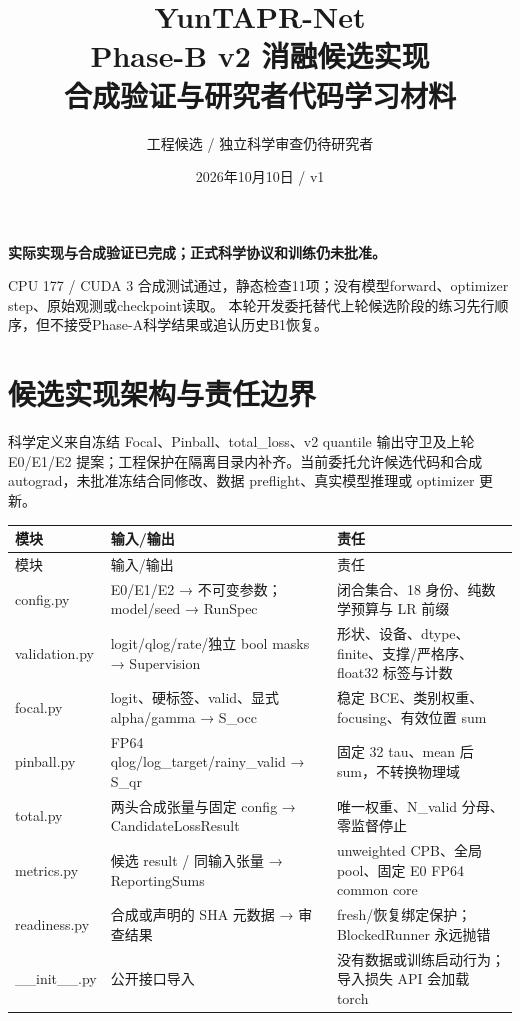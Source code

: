 \documentclass[UTF8,fontset=fandol,10pt]{ctexart}
\title{YunTAPR-Net\\Phase-B v2 消融候选实现\\合成验证与研究者代码学习材料}
\author{工程候选 / 独立科学审查仍待研究者}\date{2026年10月10日 / v1}
\begin{document}
\maketitle
\textbf{实际实现与合成验证已完成；正式科学协议和训练仍未批准。}

CPU 177 / CUDA 3 合成测试通过，静态检查11项；没有模型forward、optimizer step、原始观测或checkpoint读取。
本轮开发委托替代上轮候选阶段的练习先行顺序，但不接受Phase-A科学结果或追认历史B1恢复。
\setcounter{tocdepth}{1}\begingroup\small\setlength{\parskip}{0pt}\tableofcontents\endgroup
\clearpage\section{候选实现架构与责任边界}

科学定义来自冻结 Focal、Pinball、total\_\allowbreak{}loss、v2 quantile 输出守卫及上轮 E0/\allowbreak{}E1/\allowbreak{}E2 提案；工程保护在隔离目录内补齐。当前委托允许候选代码和合成 autograd，未批准冻结合同修改、数据 preflight、真实模型推理或 optimizer 更新。

\begingroup\small\setlength{\tabcolsep}{3pt}\renewcommand{\arraystretch}{1.12}
\begin{longtable}{>{\raggedright\arraybackslash}p{\dimexpr(\linewidth-6\tabcolsep)/3\relax}>{\raggedright\arraybackslash}p{\dimexpr(\linewidth-6\tabcolsep)/3\relax}>{\raggedright\arraybackslash}p{\dimexpr(\linewidth-6\tabcolsep)/3\relax}}
\toprule
模块 & 输入/\allowbreak{}输出 & 责任 \\
\midrule\endfirsthead
模块 & 输入/\allowbreak{}输出 & 责任 \\
\midrule\endhead
config.py & E0/\allowbreak{}E1/\allowbreak{}E2 → 不可变参数；model/\allowbreak{}seed → RunSpec & 闭合集合、18 身份、纯数学预算与 LR 前缀 \\
validation.py & logit/\allowbreak{}qlog/\allowbreak{}rate/\allowbreak{}独立 bool masks → Supervision & 形状、设备、dtype、finite、支撑/\allowbreak{}严格序、float32 标签与计数 \\
focal.py & logit、硬标签、valid、显式 alpha/\allowbreak{}gamma → S\_\allowbreak{}occ & 稳定 BCE、类别权重、focusing、有效位置 sum \\
pinball.py & FP64 qlog/\allowbreak{}log\_\allowbreak{}target/\allowbreak{}rainy\_\allowbreak{}valid → S\_\allowbreak{}qr & 固定 32 tau、mean 后 sum，不转换物理域 \\
total.py & 两头合成张量与固定 config → CandidateLossResult & 唯一权重、N\_\allowbreak{}valid 分母、零监督停止 \\
metrics.py & 候选 result /\allowbreak{} 同输入张量 → ReportingSums & unweighted CPB、全局 pool、固定 E0 FP64 common core \\
readiness.py & 合成或声明的 SHA 元数据 → 审查结果 & fresh/\allowbreak{}恢复绑定保护；BlockedRunner 永远抛错 \\
\_\allowbreak{}\_\allowbreak{}init\_\allowbreak{}\_\allowbreak{}.py & 公开接口导入 & 没有数据或训练启动行为；导入损失 API 会加载 torch \\
\bottomrule\end{longtable}\endgroup
\end{document}

